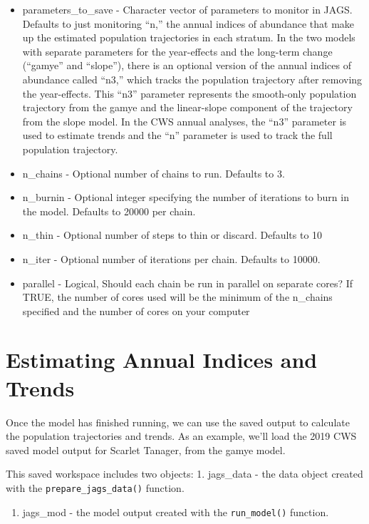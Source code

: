 \documentclass[
]{book}
\providecommand{\tightlist}{%
  \setlength{\itemsep}{0pt}\setlength{\parskip}{0pt}}
\begin{document}
\begin{itemize}
\item
  parameters\_to\_save - Character vector of parameters to monitor in JAGS. Defaults to just monitoring ``n,'' the annual indices of abundance that make up the estimated population trajectories in each stratum. In the two models with separate parameters for the year-effects and the long-term change (``gamye'' and ``slope''), there is an optional version of the annual indices of abundance called ``n3,'' which tracks the population trajectory after removing the year-effects. This ``n3'' parameter represents the smooth-only population trajectory from the gamye and the linear-slope component of the trajectory from the slope model. In the CWS annual analyses, the ``n3'' parameter is used to estimate trends and the ``n'' parameter is used to track the full population trajectory.
\item
  n\_chains - Optional number of chains to run. Defaults to 3.
\item
  n\_burnin - Optional integer specifying the number of iterations to burn in the model. Defaults to 20000 per chain.
\item
  n\_thin - Optional number of steps to thin or discard. Defaults to 10
\item
  n\_iter - Optional number of iterations per chain. Defaults to 10000.
\item
  parallel - Logical, Should each chain be run in parallel on separate cores? If TRUE, the number of cores used will be the minimum of the n\_chains specified and the number of cores on your computer
\end{itemize}

\hypertarget{IndicesTrends}{%
\chapter{Estimating Annual Indices and Trends}\label{IndicesTrends}}

Once the model has finished running, we can use the saved output to calculate the population trajectories and trends. As an example, we'll load the 2019 CWS saved model output for Scarlet Tanager, from the gamye model.

This saved workspace includes two objects: 1. jags\_data - the data object created with the \texttt{prepare\_jags\_data()} function.

\begin{enumerate}
\def\labelenumi{\arabic{enumi}.}
\setcounter{enumi}{1}
\tightlist
\item
  jags\_mod - the model output created with the \texttt{run\_model()} function.
\end{enumerate}
\end{document}
